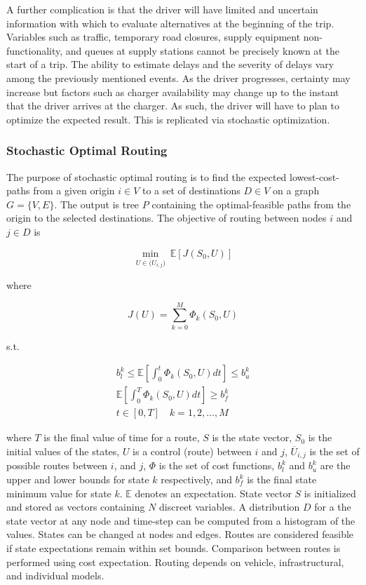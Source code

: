 \documentclass[11pt]{article}
\begin{document}
\begin{multicols}{2}
A further complication is that the driver will have limited and uncertain information with which to evaluate alternatives at the beginning of the trip. Variables such as traffic, temporary road closures, supply equipment non-functionality, and queues at supply stations cannot be precisely known at the start of a trip. The ability to estimate delays and the severity of delays vary among the previously mentioned events. As the driver progresses, certainty may increase but factors such as charger availability may change up to the instant that the driver arrives at the charger. As such, the driver will have to plan to optimize the expected result. This is replicated via stochastic optimization.

\subsubsection*{Stochastic Optimal Routing}

The purpose of stochastic optimal routing is to find the expected lowest-cost-paths from a given origin $i \in V$ to a set of destinations $D \in V$ on a graph $G = \{V, E\}$. The output is tree $P$ containing the optimal-feasible paths from the origin to the selected destinations. The objective of routing between nodes $i$ and $j\in D$ is

\begin{equation}
	\min_{U \in \overline({U}_{i,j})}\ \mathbb{E}[J(S_0, U)]
\end{equation}

where

\begin{equation}
	J(U) = \sum_{k = 0}^M \Phi_k(S_0, U)
\end{equation}

s.t.

\begin{gather}	
	b^k_l \leq \mathbb{E}\left[\int_0^t \Phi_k(S_0, U)dt\right] \leq b^k_u\\
	\mathbb{E}\left[\int_0^T \Phi_k(S_0, U)dt\right] \geq b^k_f\\
	 t \in [0, T]\quad k = 1, 2, \dots, M
\end{gather}

\noindent where $T$ is the final value of time for a route, $S$ is the state vector, $S_0$ is the initial values of the states, $U$ is a control (route) between $i$ and $j$, $\overline{U}_{i,j}$ is the set of possible routes between $i$, and $j$, $\Phi$ is the set of cost functions, $b^k_l$ and $b^k_u$ are the upper and lower bounds for state $k$ respectively, and $b^k_f$ is the final state minimum value for state $k$. $\mathbb{E}$ denotes an expectation. State vector $S$ is initialized and stored as vectors containing $N$ discreet variables. A distribution $D$ for a the state vector at any node and time-step can be computed from a histogram of the values. States can be changed at nodes and edges. Routes are considered feasible if state expectations remain within set bounds. Comparison between routes is performed using cost expectation. Routing depends on vehicle, infrastructural, and individual models.



\end{multicols}
\end{document}
